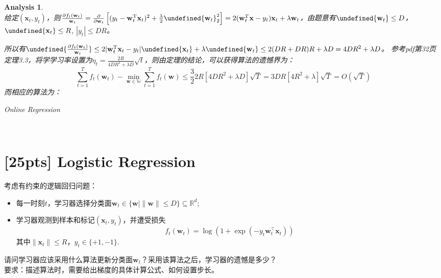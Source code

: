 \documentclass[a4paper,UTF8]{article}
\let\norm\undefined %
\DeclarePairedDelimiter\norm{\lVert}{\rVert}
\numberwithin{equation}{section}
\newtheorem*{myAnalysis}{Analysis}
\begin{document}
\begin{myAnalysis}~\\

给定$(\mathbf{x}_t, y_t)$，则$\frac{\partial f_t(\mathbf{w}_t)}{\mathbf{w}_t} = \frac{\partial}{\partial \mathbf{w}_t}\left[ (y_t - \mathbf{w}_t^\mathrm{T} \mathbf{x}_t)^2 + \frac{\lambda}{2} \norm{\mathbf{w}_t}_2^2 \right] = 2(\mathbf{w}_t^T \mathbf{x} - y_t) \mathbf{x}_t + \lambda \mathbf{w}_t$，由题意有$\norm{\mathbf{w}_t} \le D$，$\norm{\mathbf{x}_t} \le R$, $|y_t| \le DR$。

所以有$\norm{\frac{\partial f_t(\mathbf{w}_t)}{\mathbf{w}_t}} \le 2|\mathbf{w}_t^\mathrm{T} \mathbf{x}_t - y_t| \norm{\mathbf{x}_t} + \lambda \norm{\mathbf{w}_t} \le 2(DR + DR) R + \lambda D = 4DR^2 + \lambda D$。
参考pdf第32页定理3.3，将学学习率设置为$\eta_t = \frac{2R}{4DR^2 + \lambda D} \sqrt{t}$，则由定理的结论，可以获得算法的遗憾界为：
\[
\sum_{t=1}^T f_t(\mathbf{w}_t) - \min_{\mathbf{w} \in \mathbb{W}} \sum_{t=1}^T f_t(\mathbf{w}) \le \frac{3}{2} 2R [4DR^2 + \lambda D] \sqrt{T} = 3DR[4R^2 + \lambda] \sqrt{T} = O(\sqrt{T})
\]
而相应的算法为：
\begin{algorithm}  
	\caption{Online Regression}  
	\begin{algorithmic}[1] %
		  \State{ $\mathbf{w}_{t+1} = \frac{D}{\max\{ D, \norm{\mathbf{w}_{t+1}'} \} } \mathbf{w}_{t+1}' $ }
		\EndFor  
	\end{algorithmic} 
\end{algorithm}  

	~\\
\end{myAnalysis}

\newpage
\section{[25pts] Logistic Regression}
\noindent [在线分类] 考虑有约束的逻辑回归问题：
\begin{itemize}
  \item 每一时刻$t$，学习器选择分类面$\mathbf{w}_t \in \{\mathbf{w}| \|\mathbf{w}\| \leq D\} \subseteq \mathbb{R}^d$;
  \item 学习器观测到样本和标记$(\mathbf{x}_t,y_t)$，并遭受损失
  \[
  f_t(\mathbf{w}_t)=\log\left( 1+ \exp(-y_t \mathbf{w}_t^\top \mathbf{x}_t)\right)
  \]
其中$\|\mathbf{x}_t\| \leq R$，$y_t \in \{+1,-1\}$.
\end{itemize}
请问学习器应该采用什么算法更新分类面$\mathbf{w}_t$？采用该算法之后，学习器的遗憾是多少？\\
要求：描述算法时，需要给出梯度的具体计算公式、如何设置步长。
\end{document}
